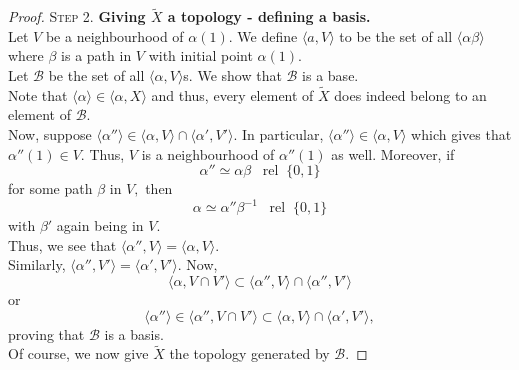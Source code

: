 \documentclass[12pt]{article}
\theoremstyle{definition}
\numberwithin{thm}{section}
\newcommand{\rel}{\;\;\operatorname{rel}\;}
\begin{document}
\begin{proof}
\textsc{Step 2.} \textbf{Giving $\tilde{X}$ a topology - defining a basis.}\\
Let $V$ be a neighbourhood of $\alpha(1).$ We define $\langle a, V\rangle$ to be the set of all $\langle \alpha\beta\rangle$ where $\beta$ is a path in $V$ with initial point $\alpha(1).$\\
Let $\mathcal{B}$ be the set of all $\langle \alpha, V\rangle$s. We show that $\mathcal{B}$	is a base.\\
Note that $\langle \alpha\rangle \in \langle \alpha, X\rangle$ and thus, every element of $\tilde{X}$ does indeed belong to an element of $\mathcal{B}.$\\
Now, suppose $\langle \alpha''\rangle \in \langle \alpha, V\rangle \cap \langle \alpha', V'\rangle.$ In particular, $\langle \alpha''\rangle \in \langle \alpha, V\rangle$ which gives that $\alpha''(1) \in V.$ Thus, $V$ is a neighbourhood of $\alpha''(1)$ as well. Moreover, if 
\begin{equation*} 
	\alpha'' \simeq \alpha\beta\rel\{0, 1\}
\end{equation*} 
for some path $\beta$ in $V,$ then 
\begin{equation*} 
	\alpha \simeq \alpha''\beta^{-1}\rel\{0, 1\}
\end{equation*} with $\beta'$ again being in $V.$\\
Thus, we see that $\langle \alpha'', V\rangle = \langle \alpha, V\rangle.$\\
Similarly, $\langle \alpha'', V'\rangle = \langle \alpha', V'\rangle.$ Now,
\begin{equation*} 
	\langle \alpha, V\cap V'\rangle \subset\langle \alpha'', V\rangle\cap\langle \alpha'', V'\rangle
\end{equation*}
or
\begin{equation*} 
	\langle \alpha''\rangle \in \langle \alpha'', V\cap V'\rangle \subset\langle \alpha, V\rangle\cap\langle \alpha', V'\rangle,
\end{equation*}
proving that $\mathcal{B}$ is a basis.\\
Of course, we now give $\tilde{X}$ the topology generated by $\mathcal{B}.$

\dotfill


\end{proof}
\end{document}
